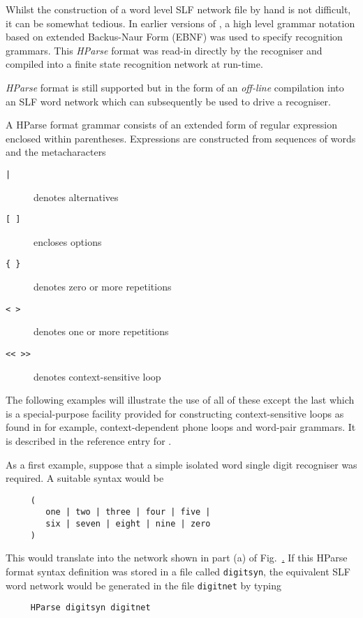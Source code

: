 
Whilst the construction of a word level SLF network file by hand
is not difficult, it can be somewhat tedious.  In earlier versions
of \HTK, a high level grammar notation based on extended 
Backus-Naur
Form (EBNF) was used to specify recognition grammars.  This 
\textit{HParse}
format was read-in directly by the recogniser and compiled into
a finite state recognition network at run-time.

\inthisversion \textit{HParse} format is still supported but in the form of
an \textit{off-line} compilation into an SLF word network which can
subsequently be used to drive a recogniser.  

A HParse format grammar consists of an 
extended form of regular expression
enclosed within parentheses.  Expressions are constructed
from sequences of words and the  metacharacters
\begin{description}
\item[\texttt{|}] denotes alternatives
\item[\texttt{[ ]}] encloses options
\item[\texttt{\{ \}}] denotes zero or more repetitions
\item[\texttt{< >}] denotes one or more repetitions
\item[\texttt{<< >>}] denotes context-sensitive loop
\end{description}
The following examples will illustrate the use of all of these
except the last which is a special-purpose facility provided
for constructing context-sensitive loops as found in for example,
context-dependent phone loops and word-pair grammars.  It is described
in the reference entry for .

As a first example, suppose
that a simple isolated word single digit recogniser was required.
A suitable syntax would be
\begin{verbatim}
     (
        one | two | three | four | five |
        six | seven | eight | nine | zero
     )
\end{verbatim}
This would translate into the network shown in part (a) of
Fig.~\href{f:digitnets}.
If this HParse format syntax definition
was stored in a file called {\tt digitsyn},
the equivalent SLF word network would be generated in the
file \texttt{digitnet} by typing
\begin{verbatim}
     HParse digitsyn digitnet
\end{verbatim}

